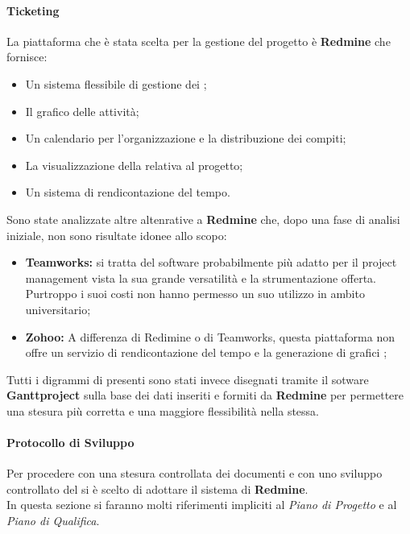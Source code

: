       \paragraph{Ticketing}
        La piattaforma che è stata scelta per la gestione del progetto è \textbf{Redmine} che fornisce:
        \begin{itemize}
          \item Un sistema flessibile di gestione dei ;
          \item Il grafico  delle attività;
          \item Un calendario per l'organizzazione e la distribuzione dei compiti;
          \item La visualizzazione della  relativa al progetto;
          \item Un sistema di rendicontazione del tempo.
        \end{itemize}
        Sono state analizzate altre altenrative a \textbf{Redmine} che, dopo una fase di analisi iniziale, non sono risultate idonee allo scopo:
        \begin{itemize}
          \item \textbf{Teamworks: }si tratta del software probabilmente più adatto per il project management vista la sua grande versatilità e
          la strumentazione offerta. Purtroppo i suoi costi non hanno permesso un suo utilizzo in ambito universitario;
          \item \textbf{Zohoo: }A differenza di Redimine o di Teamworks, questa piattaforma non offre un servizio di rendicontazione del tempo
          e la generazione di grafici ;
        \end{itemize}
        Tutti i digrammi di  presenti sono stati invece disegnati tramite il sotware \textbf{Ganttproject} sulla base dei dati inseriti e formiti da \textbf{Redmine}
        per permettere una stesura più corretta e una maggiore flessibilità nella stessa.
      \paragraph{Protocollo di Sviluppo}
        Per procedere con una stesura controllata dei documenti e con uno sviluppo controllato del  si è scelto di adottare
        il sistema di  \textbf{Redmine}.\\
        In questa sezione si faranno molti riferimenti impliciti al \emph{Piano di Progetto} e al \emph{Piano di  Qualifica}.
